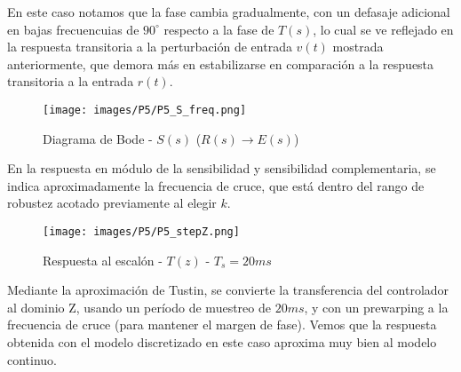 \documentclass[ca_tp2_main.tex]{subfiles}
\begin{document}
En este caso notamos que la fase cambia gradualmente, con un defasaje adicional en bajas frecuencuias de $90^{\circ}$ respecto a la fase de $T(s)$, lo cual se ve reflejado en la respuesta transitoria a la perturbación de entrada $v(t)$ mostrada anteriormente, que demora más en estabilizarse en comparación a la respuesta transitoria a la entrada $r(t)$.

\begin{figure}[H]
\centering
\texttt{[image: images/P5/P5\_S\_freq.png]}
\caption{Diagrama de Bode - $S(s)$ ($R(s) \rightarrow E(s)$)}
\end{figure}

En la respuesta en módulo de la sensibilidad y sensibilidad complementaria, se indica aproximadamente la frecuencia de cruce, que está dentro del rango de robustez acotado previamente al elegir $k$.

\begin{figure}[H]
\centering
\texttt{[image: images/P5/P5\_stepZ.png]}
\caption{Respuesta al escalón - $T(z)$ - $T_s = 20ms$}
\end{figure}

Mediante la aproximación de Tustin, se convierte la transferencia del controlador al dominio Z, usando un período de muestreo de $20ms$, y con un prewarping a la frecuencia de cruce (para mantener el margen de fase). Vemos que la respuesta obtenida con el modelo discretizado en este caso aproxima muy bien al modelo continuo.
\end{document}
